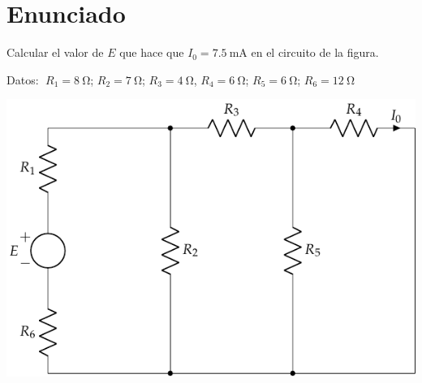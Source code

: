 
  \section{Enunciado}
  Calcular el valor de $E$ que hace que $I_0=\qty{7.5}{\milli\ampere}$
  en el circuito de la figura.

\vspace{2mm}
Datos: $\; R_1 = \qty{8}{\ohm}$;\; $R_2 = \qty{7}{\ohm}$;\; $R_3 = \qty{4}{\ohm}$,\; $R_4 = \qty{6}{\ohm}$;\; $R_5 = \qty{6}{\ohm}$;\; $R_6 = \qty{12}{\ohm}$

  \begin{center}
    \includegraphics{figuras/BT1_03.pdf}
  \end{center}
   

